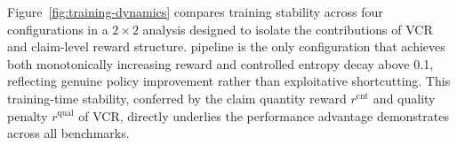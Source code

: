 
Figure~\ref{fig:training-dynamics} compares training stability across four configurations in a $2{\times}2$ analysis designed to isolate the contributions of VCR and claim-level reward structure.
\ours pipeline is the only configuration that achieves both monotonically increasing reward and controlled entropy decay above 0.1, reflecting genuine policy improvement rather than exploitative shortcutting.
This training-time stability, conferred by the claim quantity reward $r^{\mathrm{cnt}}$ and quality penalty $r^{\mathrm{qual}}$ of VCR, directly underlies the performance advantage \ours demonstrates across all benchmarks.

